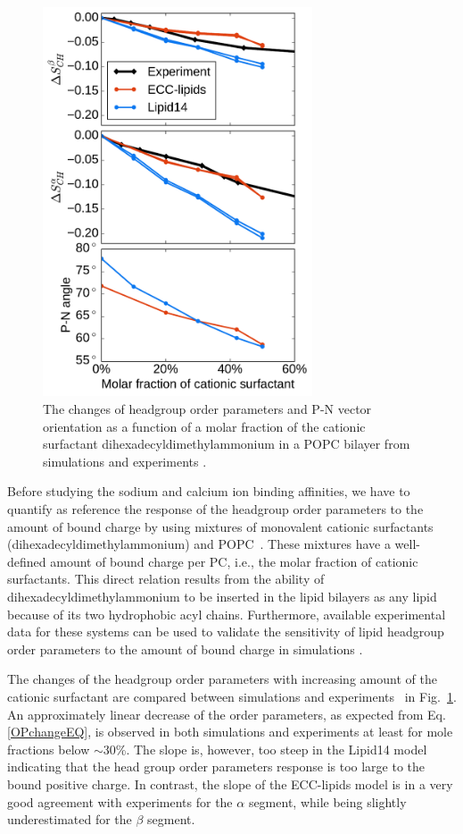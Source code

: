 \documentclass[aip,jcp,twocolumn]{revtex4}
\begin{document}
\begin{figure}[tb!]
  \centering
  \includegraphics[width=8.0cm]{../Fig/ipython_nb/PN_angle_OrdPars-A-B_L14-ECCL17_q80_sig89_surf.pdf}
  \caption{\label{OrderParameterCHANGESsurf}
    The changes of headgroup order parameters and P-N vector orientation as a function of
    a molar fraction of the cationic surfactant dihexadecyldimethylammonium in a POPC bilayer
    from simulations and experiments \cite{scherer89}.
  }
\end{figure}

Before studying the sodium and calcium ion binding affinities, we have to quantify as reference the response of the headgroup order parameters to the amount of bound charge by using mixtures of monovalent cationic surfactants (dihexadecyldimethylammonium) and POPC~\cite{scherer89}. These mixtures have a well-defined amount of bound charge per PC, i.e., the molar fraction of cationic surfactants. This direct relation results from the ability of dihexadecyldimethylammonium to be inserted in the lipid bilayers as any lipid because of its two hydrophobic acyl chains. Furthermore, available experimental data for these systems can be used to validate the sensitivity of lipid headgroup order parameters to the amount of bound charge in simulations \cite{REF}.

The changes of the headgroup order parameters with increasing amount of the cationic surfactant are compared between simulations and experiments~\cite{scherer89} in Fig.~\ref{OrderParameterCHANGESsurf}. An approximately linear decrease of the order parameters, as expected from Eq. \ref{OPchangeEQ}, is observed in both simulations and experiments at least for mole fractions below $\sim$30\%. The slope is, however, too steep in the Lipid14 model indicating that the head group order parameters response is too large to the bound positive charge. In contrast, the slope of the ECC-lipids model is in a very good agreement with experiments for the $\alpha$ segment, while being slightly underestimated for the $\beta$ segment.
\end{document}
